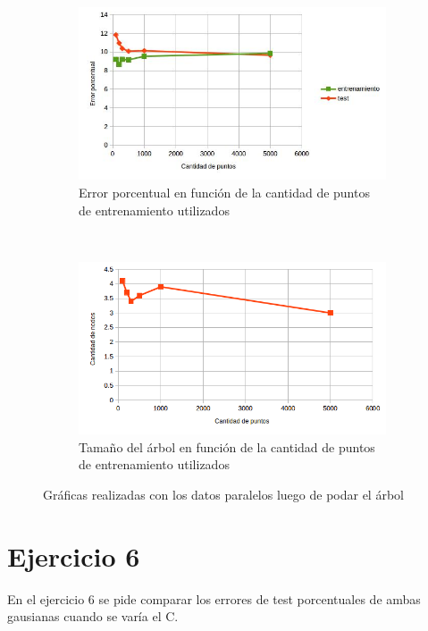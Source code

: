 \documentclass[12pt, a4paper]{article}
\begin{document}
\begin{figure}
    \centering

    \begin{subfigure}[b]{0.65\textwidth}
        \includegraphics[width=\textwidth]{errorAB}
        \caption{Error porcentual en función de la cantidad de puntos de entrenamiento utilizados}
    \end{subfigure}
      ~ %
    \begin{subfigure}[b]{0.65\textwidth}
        \includegraphics[width=\textwidth]{sizeAB}
        \caption{Tamaño del árbol en función de la cantidad de puntos de entrenamiento utilizados}
    \end{subfigure}
    \caption{Gráficas realizadas con los datos paralelos luego de podar el árbol}
\end{figure}

\section*{Ejercicio 6}
En el ejercicio 6 se pide comparar los errores de test porcentuales de ambas gausianas cuando se varía el C. 
\end{document}
